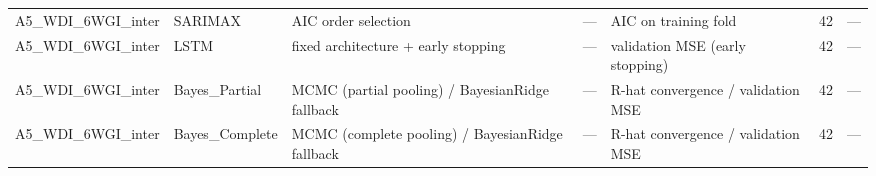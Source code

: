 \begin{table}
\begin{tabular}{lllllrl}
A5\_WDI\_6WGI\_inter & SARIMAX & AIC order selection & — & AIC on training fold & 42 & — \\
A5\_WDI\_6WGI\_inter & LSTM & fixed architecture + early stopping & — & validation MSE (early stopping) & 42 & — \\
A5\_WDI\_6WGI\_inter & Bayes\_Partial & MCMC (partial pooling) / BayesianRidge fallback & — & R-hat convergence / validation MSE & 42 & — \\
A5\_WDI\_6WGI\_inter & Bayes\_Complete & MCMC (complete pooling) / BayesianRidge fallback & — & R-hat convergence / validation MSE & 42 & — \\
\bottomrule
\end{tabular}
\end{table}
